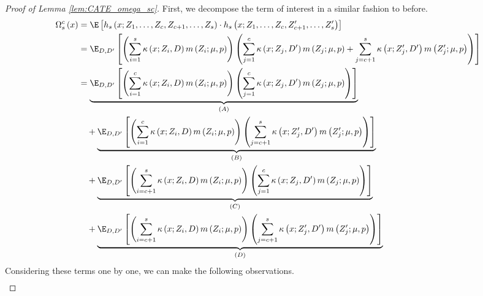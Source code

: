 \begin{proof}[Proof of Lemma \ref{lem:CATE_omega_sc}]
    First, we decompose the term of interest in a similar fashion to before.
	\begin{equation}
        \begin{aligned}
            \Omega_{s}^{c}\left(x\right)
		    & = \E\left[h_{s}\left(x; Z_1, \ldots, Z_{c}, Z_{c+1}, \ldots, Z_{s}\right) \cdot
			h_{s}\left(x; Z_1, \ldots,Z_{c}, Z_{c+1}^{\prime}, \ldots, Z_{s}^{\prime}\right)\right]\\
            & = \E_{D, D^{\prime}}\left[
                \left(\sum_{i = 1}^{s} \kappa\left(x; Z_{i}, D\right) m\left(Z_{i}; \mu, p\right)\right) 
                \left(\sum_{j = 1}^{c} \kappa\left(x; Z_{j}, D^{\prime}\right) m\left(Z_{j}; \mu, p\right) + \sum_{j = c + 1}^{s} \kappa\left(x; Z_{j}^{\prime}, D^{\prime}\right) m\left(Z_{j}^{\prime}; \mu, p\right)\right)
            \right]\\
            & = \underbrace{\E_{D, D^{\prime}}\left[\left(\sum_{i = 1}^{c} \kappa\left(x; Z_{i}, D\right) m\left(Z_{i}; \mu, p\right)\right)
            \left(\sum_{j = 1}^{c} \kappa\left(x; Z_{j}, D^{\prime}\right) m\left(Z_{j}; \mu, p\right)\right)\right]}_{(A)} \\
            & \quad + \underbrace{\E_{D, D^{\prime}}\left[\left(\sum_{i = 1}^{c} \kappa\left(x; Z_{i}, D\right) m\left(Z_{i}; \mu, p\right)\right)
            \left(\sum_{j = c + 1}^{s} \kappa\left(x; Z_{j}^{\prime}, D^{\prime}\right) m\left(Z_{j}^{\prime}; \mu, p\right)\right)\right]}_{(B)} \\
            & \quad + \underbrace{\E_{D, D^{\prime}}\left[\left(\sum_{i = c + 1}^{s} \kappa\left(x; Z_{i}, D\right) m\left(Z_{i}; \mu, p\right)\right)
            \left(\sum_{j = 1}^{c} \kappa\left(x; Z_{j}, D^{\prime}\right) m\left(Z_{j}; \mu, p\right)\right)\right]}_{(C)} \\
            & \quad + \underbrace{\E_{D, D^{\prime}}\left[\left(\sum_{i = c + 1}^{s} \kappa\left(x; Z_{i}, D\right) m\left(Z_{i}; \mu, p\right)\right)
            \left(\sum_{j = c + 1}^{s} \kappa\left(x; Z_{j}^{\prime}, D^{\prime}\right) m\left(Z_{j}^{\prime}; \mu, p\right)\right)\right]}_{(D)} 
        \end{aligned}
    \end{equation}
    Considering these terms one by one, we can make the following observations.
    \begin{equation}
        \begin{aligned}

\end{aligned}
\end{equation}
\end{proof}
